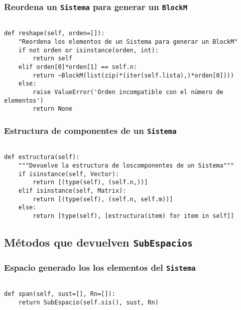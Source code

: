 \documentclass[11pt]{report}
\begin{document}
\subsubsection{Reordena un \texttt{Sistema} para generar un \texttt{BlockM}}
\label{sec:org008eab6}
\begin{verbatim}
   
def reshape(self, orden=[]):
    "Reordena los elementos de un Sistema para generar un BlockM"
    if not orden or isinstance(orden, int):
        return self
    elif orden[0]*orden[1] == self.n:
        return ~BlockM(list(zip(*(iter(self.lista),)*orden[0])))
    else:
        raise ValueError('Orden incompatible con el número de elementos')
        return None

\end{verbatim}

\subsubsection{Estructura de componentes de un \texttt{Sistema}}
\label{sec:orgd181cdc}
\begin{verbatim}

def estructura(self):
    """Devuelve la estructura de loscomponentes de un Sistema"""
    if isinstance(self, Vector):
        return [(type(self), (self.n,))]
    elif isinstance(self, Matrix):
        return [(type(self), (self.n, self.m))]
    else:
        return [type(self), [estructura(item) for item in self]]

\end{verbatim}

\subsection{Métodos que devuelven \texttt{SubEspacios}}
\label{sec:org2ea1022}
\subsubsection{Espacio generado los los elementos del \texttt{Sistema}}
\label{sec:orgc73acb4}

\begin{verbatim}

def span(self, sust=[], Rn=[]):
    return SubEspacio(self.sis(), sust, Rn)

\end{verbatim}
\end{document}
